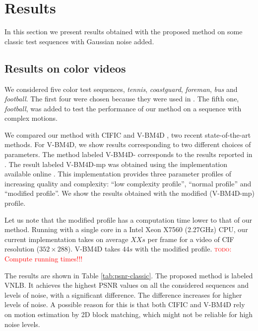 \documentclass[10pt, journal, twocolumn, final, a4paper]{IEEEtran}
\newcommand{\todo}[1]{\textcolor{red}{\noindent\textsc{todo}: #1}}
\begin{document}
\section{Results}
\label{sec:results}

In this section we present results obtained with the proposed
method on some classic test sequences with Gaussian noise added.

\subsection{Results on color videos}

We considered five color test sequences, \emph{tennis}, \emph{coastguard},
\emph{foreman}, \emph{bus} and \emph{football}. The first four were chosen
because they were used in \cite{Maggioni2012}. The fifth one, \emph{football},
was added to test the performance of our method on a sequence with complex motions.

We compared our method with CIFIC \cite{Dai2013} and V-BM4D \cite{Maggioni2012}, two recent
state-of-the-art methods. For V-BM4D, we show results corresponding to two
different choices of parameters. The method labeled V-BM4D-\cite{Maggioni2012}
corresponds to the results reported
in \cite{Maggioni2012}. The result labeled V-BM4D-mp was
obtained using the implementation available online \cite{bm4dcode}. This
implementation provides three parameter profiles of increasing quality and
complexity: ``low complexity profile'', ``normal profile'' and ``modified
profile''. We show the results obtained with the modified (V-BM4D-mp) profile.

Let us note that the modified profile has a
computation time lower to that of our method. Running with a
single core in a Intel Xeon X7560 (2.27GHz) CPU, 
our current implementation takes on average $XXs$ per frame for a video of CIF
resolution ($352\times288$). V-BM4D takes $44s$ with the modified profile.
\todo{Compute running times!!!}

The results are shown in Table \ref{tab:psnr-classic}. The proposed method is
labeled VNLB. It achieves the highest PSNR values on all the considered
sequences and levels of noise, with a significant difference. The difference
increases for higher levels of noise. A possible reason for this is that both 
CIFIC and V-BM4D rely on motion estimation by 2D block matching, which might
not be reliable for high noise levels.

\end{document}
